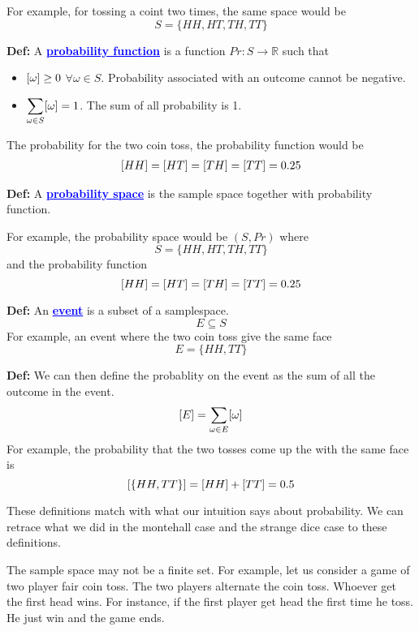 \documentclass[a4paper, 12pt]{article}
\newcommand{\real}{\mathbb{R}}
\newcommand{\definition}{\vspace{1em}\noindent\textbf{Def:} }
\newcommand{\kwd}[1]{\textcolor{blue}{\textbf{\underline{#1}}}}
\let\Pr\relax
\DeclareMathOperator{\Pr}{Pr}
\begin{document}
\begin{multicols}{2}
For example, for tossing a coint two times, the same space would be
\[
	S = \{HH, HT, TH, TT\}
\]

\definition A \kwd{probability function} is a function $Pr: S \to \real$ such that
\begin{itemize}
	\item $\Pr[\omega] \ge 0$ $\forall \omega \in S$. Probability associated with an outcome cannot be negative.
	\item $\displaystyle \sum_{\omega \in S} \Pr[\omega] = 1$. The sum of all probability is 1.
\end{itemize} 

The probability for the two coin toss, the probability function would be
\begin{align*}
	\Pr[HH] = \Pr[HT] = \Pr[TH] = \Pr[TT] = 0.25
\end{align*}


\definition A \kwd{probability space} is the sample space together with probability function.

For example, the probability space would be $(S, Pr)$ where
\begin{equation*}
	S = \{HH, HT, TH, TT\}
\end{equation*}
and the probability function
\begin{equation*}
	\Pr[HH] = \Pr[HT] = \Pr[TH] = \Pr[TT] = 0.25
\end{equation*}

\definition An \kwd{event} is a subset of a samplespace.\[
 E \subseteq S
\]
For example, an event where the two coin toss give the same face
\[
	E = \{ HH, TT\}
\]

\definition We can then define the probablity on the event as the sum of all the outcome in the event.
\[
	\Pr[E] = \sum_{\omega \in E} \Pr[\omega]
\]
For example, the probability that the two tosses come up the with the same face is
\[
	\Pr[\{HH, TT\}] = \Pr[HH] + \Pr[TT] = 0.5
\]

These definitions match with what our intuition says about probability. We can retrace what we did in the montehall case and the strange dice case to these definitions.

The sample space may not be a finite set. For example, let us consider a game of two player fair coin toss. The two players alternate the coin toss. Whoever get the first head wins. For instance, if the first player get head the first time he toss. He just win and the game ends.



\end{multicols}
\end{document}
